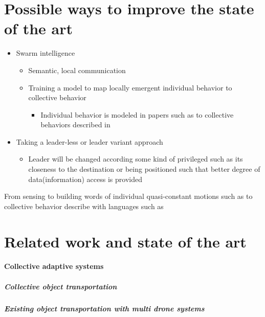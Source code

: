 \documentclass{article}
\begin{document}
	\section{Possible ways to improve the state of the art}
		\begin{itemize}
			\item Swarm intelligence
				\begin{itemize}
					\item Semantic, local communication
					\item Training a model to map locally emergent individual behavior to collective behavior
					\begin{itemize}
						\item Individual behavior is modeled in papers such as \cite{kanapram-2020-collective-awareness-for-abnormality-detection-in-connected-autonomous-vehicles} to collective behaviors described in \cite{baydoun-2019-prediction-of-multi-target-dynamics-using-discrete-descriptors-an-interactive-approach}
					\end{itemize}
				\end{itemize}
	    	\item Taking a leader-less or leader variant approach
	    		\begin{itemize}
	    			\item Leader will be changed according some kind of privileged such as its closeness to the destination or being positioned such that better degree of data(information) access is provided
	    		\end{itemize} 
		\end{itemize}
		From sensing to building words of individual quasi-constant motions such as \cite{kanapram-2020-collective-awareness-for-abnormality-detection-in-connected-autonomous-vehicles} to collective behavior describe with languages such as \cite{baydoun-2019-prediction-of-multi-target-dynamics-using-discrete-descriptors-an-interactive-approach}
	
	\section{Related work and state of the art}
		\paragraph{Collective adaptive systems}
			\subparagraph{Collective object transportation}
			\subparagraph{Existing object transportation with multi drone systems}
			\cite{jackson-2020-scalable-cooperative-transport-of-cable-suspended-loads-with-uavs-using-distributed-trajectory-optimization}
\end{document}
